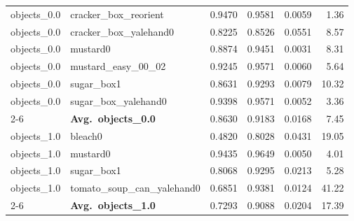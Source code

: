 \begin{longtable}{llrrrr}
  objects_0.0 & cracker\_box\_reorient & 0.9470 & 0.9581 & 0.0059 & 1.36 \\
  objects_0.0 & cracker\_box\_yalehand0 & 0.8225 & 0.8526 & 0.0551 & 8.57 \\
  objects_0.0 & mustard0 & 0.8874 & 0.9451 & 0.0031 & 8.31 \\
  objects_0.0 & mustard\_easy\_00\_02 & 0.9245 & 0.9571 & 0.0060 & 5.64 \\
  objects_0.0 & sugar\_box1 & 0.8631 & 0.9293 & 0.0079 & 10.32 \\
  objects_0.0 & sugar\_box\_yalehand0 & 0.9398 & 0.9571 & 0.0052 & 3.36 \\
  \cmidrule{2-6}
  & \textbf{Avg.~objects_0.0} & 0.8630 & 0.9183 & 0.0168 & 7.45 \\
  \midrule
  objects_1.0 & bleach0 & 0.4820 & 0.8028 & 0.0431 & 19.05 \\
  objects_1.0 & mustard0 & 0.9435 & 0.9649 & 0.0050 & 4.01 \\
  objects_1.0 & sugar\_box1 & 0.8068 & 0.9295 & 0.0213 & 5.28 \\
  objects_1.0 & tomato\_soup\_can\_yalehand0 & 0.6851 & 0.9381 & 0.0124 & 41.22 \\
  \cmidrule{2-6}
  & \textbf{Avg.~objects_1.0} & 0.7293 & 0.9088 & 0.0204 & 17.39 \\
  \midrule
\bottomrule
\end{longtable}